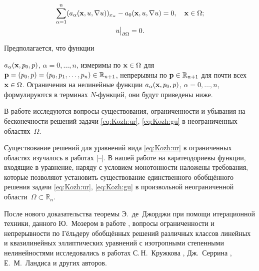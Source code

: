 \begin{gather}\label{eq:Kozh:ur}

 \sum\limits_{\alpha=1}^{n}(a_{\alpha}({\bf x},u,\nabla u))_{x_{\alpha}}-a_0({\bf x},u,\nabla u)=0,\quad {\bf x} \in \Omega;

\\

\label{eq:Kozh:gu}

  u\big|_{\partial\Omega}= 0.

\end{gather}

Предполагается, что функции

$a_{\alpha}({\bf x},p_0,p)$, $\alpha=0,\ldots,n$,   измеримы по ${\bf x}\in \Omega$ для ${\bf p}=(p_0,p)=(p_0,p_1,\ldots,p_{n})\in\mathbb{R}_{n+1}$, непрерывны по ${\bf p}\in\mathbb{R}_{n+1}$ для почти всех ${\bf x}\in\Omega$. Ограничения на нелинейные функции $a_{\alpha}({\bf x},p_0,p)$, $\alpha=0,\ldots,n$, формулируются в терминах $N$-функций, они   будут приведены ниже.





В работе исследуются вопросы существования, ограниченности и убывания на бесконечности решений задачи \eqref{eq:Kozh:ur}, \eqref{eq:Kozh:gu}  в неограниченных областях~$\Omega$.



Существование решений для уравнений вида \eqref{eq:Kozh:ur} в ограниченных областях изучалось в работах [--]. В нашей работе на  каратеодориевы функции, входящие в уравнение, наряду с условием монотонности наложены требования, которые позволяют установить существование единственного обобщённого решения задачи \eqref{eq:Kozh:ur}, \eqref{eq:Kozh:gu} в произвольной неограниченной области~$\Omega\subset\mathbb{R}_{n}$.



После нового доказательства теоремы Э.~де~Джорджи \cite{KozhKhad:bib:Giorgi} при помощи итерационной техники, данного Ю.~Мозером в работе \cite{KozhKhad:bib:Moser},   вопросы ограниченности и непрерывности по Гёльдеру обобщённых решений различных классов линейных и квазилинейных эллиптических уравнений с изотропными степенными нелинейностями исследовались в работах С.\,Н.~Кружкова \cite{KozhKhad:bib:Kruzhkov}, Дж.~Серрина \cite{KozhKhad:bib:Serrin}, Е.~М.~Ландиса \cite{KozhKhad:bib:Landis} и других авторов.





